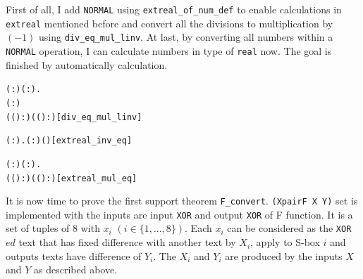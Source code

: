 \documentclass{article}
\begin{document}
First of all, I add \verb|NORMAL| using \verb|extreal_of_num_def| to enable calculations in \verb|extreal| mentioned before
and convert all the divisions to multiplication by $(-1)$ using \verb|div_eq_mul_linv|. At last, by converting all numbers within a
\verb|NORMAL| operation, I can calculate numbers in type of \verb|real| now. The goal is finished by automatically calculation.

\begin{alltt}
\HOLTokenTurnstile{} \HOLSymConst{\HOLTokenForall{}}( :) ( :).
      \HOLSymConst{\HOLTokenNotEqual{}} \HOLSymConst{\ensuremath{+\infty}} \HOLSymConst{\HOLTokenConj{}}  \HOLSymConst{\HOLTokenNotEqual{}} \HOLSymConst{\ensuremath{-\infty}} \HOLSymConst{\HOLTokenConj{}} ( :) \HOLSymConst{\HOLTokenLt{}}  \HOLSymConst{\HOLTokenImp{}}
     (( \HOLSymConst{/} ) :) \HOLSymConst{=} ((\HOLSymConst{\HOLTokenInverse{}} \HOLSymConst{\HOLTokenProd{}} ) :)\hfill{[div_eq_mul_linv]}
\end{alltt}

\begin{alltt}
\HOLTokenTurnstile{} \HOLSymConst{\HOLTokenForall{}}( :).  \HOLSymConst{\HOLTokenNotEqual{}} ( :) \HOLSymConst{\HOLTokenImp{}} ( )\HOLSymConst{\HOLTokenInverse{}} \HOLSymConst{=}  \HOLSymConst{\HOLTokenInverse{}}\hfill{[extreal_inv_eq]}
\end{alltt}

\begin{alltt}
\HOLTokenTurnstile{} \HOLSymConst{\HOLTokenForall{}}( :) ( :).
     ((  \HOLSymConst{\HOLTokenProd{}}  ) :) \HOLSymConst{=}  (( \HOLSymConst{\HOLTokenProd{}} ) :)\hfill{[extreal_mul_eq]}
\end{alltt}

It is now time to prove the first support theorem \verb|F_convert|. \verb|(XpairF X Y)| set is implemented
with the inputs are input \verb|XOR| and output \verb|XOR| of F function. It is a set of tuples of 8 with $x_i$ $(i \in \{1, \dots, 8\})$.
Each $x_i$ can be considered as the \verb|XOR|$ed$ text that has fixed difference with another text by $X_i$, apply to S-box $i$
and outputs texts have difference of $Y_i$. The $X_i$ and $Y_i$ are produced by the inputs $X$ and $Y$ as described above.
\end{document}
